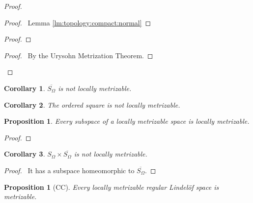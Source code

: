 \documentclass{report}
\let\qed\relax
\newtheorem{prop}[lm]{Proposition}
\newtheorem{cor}{Corollary}[lm]
\theoremstyle{definition}
\begin{document}
 \begin{proof}
  \pf
  \begin{proof}
    \pf\ Lemma \ref{lm:topology:compact:normal}
  \end{proof}
  \begin{proof}
  \end{proof}
  \qedstep
  \begin{proof}
    \pf\ By the Urysohn Metrization Theorem.
  \end{proof}
  \qed
 \end{proof}

 \begin{cor}
   $\overline{S_\Omega}$ is not locally metrizable.
 \end{cor}

 \begin{cor}
  The ordered square is not locally metrizable.
 \end{cor}

  \begin{prop}
 Every subspace of a locally metrizable space is locally metrizable.
\end{prop}

\begin{proof}
 \pf
 \qed
\end{proof}

\begin{cor}
  $S_\Omega \times \overline{S_\Omega}$ is not locally metrizable.
\end{cor}

\begin{proof}
  \pf\ It has a subspace homeomorphic to $\overline{S_\Omega}$. \qed
\end{proof}

 \begin{prop}[CC]
   Every locally metrizable regular Lindel\"{o}f space is metrizable.
 \end{prop}
\end{document}
